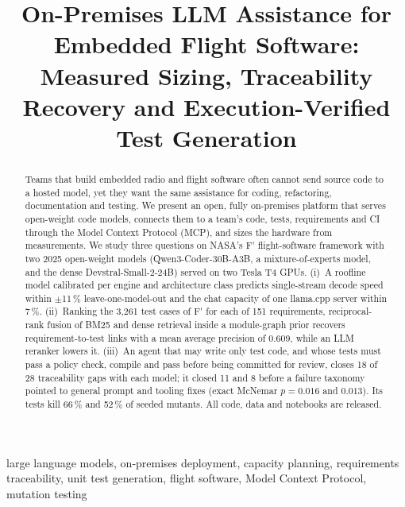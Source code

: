 \documentclass[conference]{IEEEtran}
\newcommand{\Fp}{F\'{}}  %
\begin{document}
\title{On-Premises LLM Assistance for Embedded Flight Software:\\
Measured Sizing, Traceability Recovery and Execution-Verified Test Generation}

\author{
}

\maketitle

\begin{abstract}
Teams that build embedded radio and flight software often cannot send source code to a hosted model, yet they want
the same assistance for coding, refactoring, documentation and testing. We present an open, fully on-premises
platform that serves open-weight code models, connects them to a team's code, tests, requirements and CI through
the Model Context Protocol (MCP), and sizes the hardware from measurements. We study three questions on NASA's
\Fp{} flight-software framework with two 2025 open-weight models (Qwen3-Coder-30B-A3B, a mixture-of-experts model,
and the dense Devstral-Small-2-24B) served on two Tesla T4 GPUs. (i)~A roofline model calibrated per engine and
architecture class predicts single-stream decode speed within $\pm$11\,\% leave-one-model-out and the chat capacity
of one llama.cpp server within 7\,\%. (ii)~Ranking the 3{,}261 test cases of \Fp{} for each of 151 requirements,
reciprocal-rank fusion of BM25 and dense retrieval inside a module-graph prior recovers requirement-to-test links
with a mean average precision of 0.609, while an LLM reranker lowers it. (iii)~An agent that may write only test
code, and whose tests must pass a policy check, compile and pass before being committed for review, closes
18 of 28 traceability gaps with each model; it closed 11 and 8 before a failure taxonomy pointed to general prompt
and tooling fixes (exact McNemar $p = 0.016$ and $0.013$). Its tests kill 66\,\% and 52\,\% of seeded mutants.
All code, data and notebooks are released.
\end{abstract}

\begin{IEEEkeywords}
large language models, on-premises deployment, capacity planning, requirements traceability, unit test generation,
flight software, Model Context Protocol, mutation testing
\end{IEEEkeywords}
\end{document}
